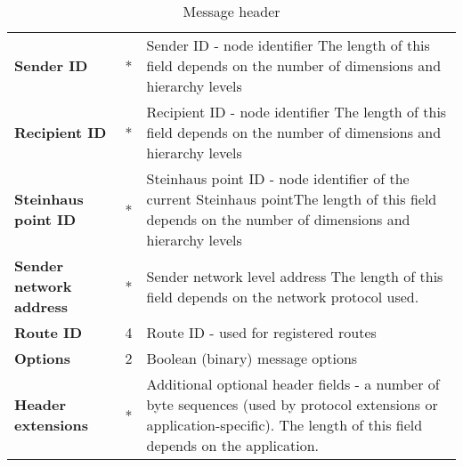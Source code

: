 \begin{table}[H]
\begin{center}
\begin{tabular}{p{3cm} p{2cm} p{9.5cm}}
	\textbf{Sender ID}					& *										& Sender ID - node identifier \newline * The length of this field depends on the number of dimensions and hierarchy levels									\\[1.5mm]
	\textbf{Recipient ID}				& *										& Recipient ID - node identifier \newline * The length of this field depends on the number of dimensions and hierarchy levels									\\[1.5mm]
	\textbf{Steinhaus point ID}			& *										& Steinhaus point ID - node identifier of the current Steinhaus point\newline * The length of this field depends on the number of dimensions and hierarchy levels						\\[1.5mm]
	\textbf{Sender network address}		& *										& Sender network level address \newline * The length of this field depends on the network protocol used.									\\[1.5mm]
	\textbf{Route ID}					& 4										& Route ID - used for registered routes									\\[1.5mm]
	\textbf{Options}					& 2										& Boolean (binary) message options										\\[1.5mm]
	\textbf{Header extensions}			& *										& Additional optional header fields - a number of byte sequences (used by protocol extensions or application-specific). \newline * The length of this field depends on the application.							\\[1.5mm]	
    \hline
\end{tabular}
\end{center}
\caption{Message header}
\label{tab:protMsgHeader}
\end{table}

